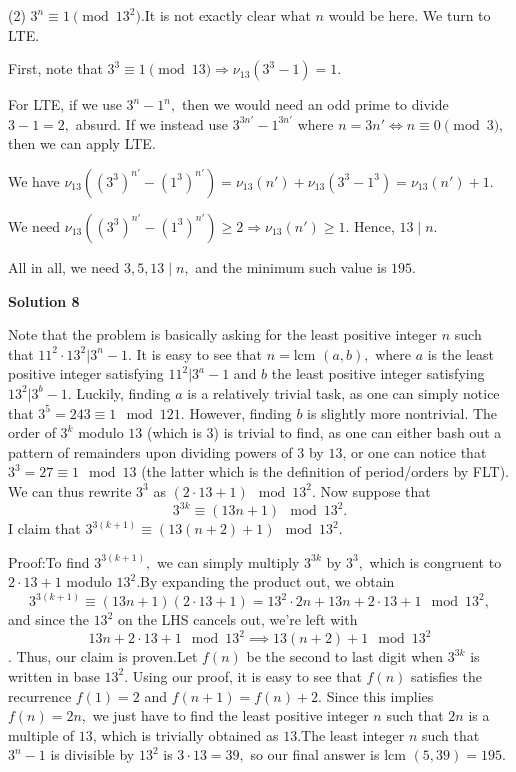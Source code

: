\begin{enumerate}
 (2) $3^n \equiv 1 \pmod {13^2}.$It is not exactly clear what $n$ would be here. We turn to LTE.

 First, note that $3^3 \equiv 1 \pmod {13} \Rightarrow \nu_{13}(3^3-1)=1.$

 For LTE, if we use $3^n-1^n,$ then we would need an odd prime to divide $3-1=2,$ absurd. If we instead use $3^{3n'}-1^{3n'}$ where $n=3n' \iff n \equiv 0 \pmod 3,$ then we can apply LTE.

 We have $\nu_{13}((3^3)^{n'}-(1^3)^{n'})=\nu_{13}(n')+\nu_{13}(3^3-1^3)=\nu_{13}(n')+1.$

 We need $\nu_{13}((3^3)^{n'}-(1^3)^{n'}) \geq 2 \Rightarrow \nu_{13}(n') \geq 1.$ Hence, $13 \mid n.$

 All in all, we need $3, 5, 13 \mid n,$ and the minimum such value is $195.$




\textbf{Solution 8}

Note that the problem is basically asking for the least positive integer $n$ such that $11^2 \cdot 13^2 | 3^n - 1.$ It is easy to see that $n = \text{lcm } (a, b),$ where $a$ is the least positive integer satisfying $11^2 | 3^a - 1$ and $b$ the least positive integer satisfying $13^2 | 3^b - 1$. Luckily, finding $a$ is a relatively trivial task, as one can simply notice that $3^5 = 243 \equiv 1 \mod 121$. However, finding $b$ is slightly more nontrivial. The order of $3^k$ modulo $13$ (which is $3$) is trivial to find, as one can either bash out a pattern of remainders upon dividing powers of $3$ by $13$, or one can notice that $3^3 = 27 \equiv 1 \mod 13$ (the latter which is the definition of period/orders by FLT). We can thus rewrite $3^3$ as $(2 \cdot 13 + 1) \mod 13^2$. Now suppose that 
 \[3^{3k} \equiv (13n + 1) \mod 13^2.\] I claim that $3^{3(k+1)} \equiv (13(n+2) + 1) \mod 13^2.$

 Proof:To find $3^{3(k+1)},$ we can simply multiply $3^{3k}$ by $3^3,$ which is congruent to $2 \cdot 13 + 1$ modulo $13^2$.By expanding the product out, we obtain 
 \[3^{3(k+1)} \equiv (13n + 1)(2 \cdot 13 + 1) = 13^2 \cdot 2n + 13n + 2 \cdot 13 + 1 \mod 13^2,\] and since the $13^2$ on the LHS cancels out, we're left with 
 \[13n + 2 \cdot 13 + 1 \mod 13^2 \implies 13(n+2) + 1 \mod 13^2\]. Thus, our claim is proven.Let $f(n)$ be the second to last digit when $3^{3k}$ is written in base $13^2$. Using our proof, it is easy to see that $f(n)$ satisfies the recurrence $f(1) = 2$ and $f(n+1) = f(n) + 2$. Since this implies $f(n) = 2n,$ we just have to find the least positive integer $n$ such that $2n$ is a multiple of $13$, which is trivially obtained as $13$.The least integer $n$ such that $3^n - 1$ is divisible by $13^2$ is $3 \cdot 13 = 39,$ so our final answer is $\text{lcm } (5, 39) = \boxed{195}.$


\end{enumerate}
